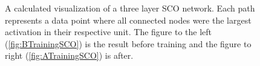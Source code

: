 \begin{figure}
    \caption[A calculated visualization of the activation of a three layer \acs{SCO} network, after training and displaying the
    signal and background separately.]{A calculated visualization of a three layer \acs{SCO} network. Each path 
    represents a data point where all connected nodes were the largest activation in their respective 
    unit. The figure to the left (\ref{fig:BTrainingSCO}) is the result before training and the figure to right (\ref{fig:ATrainingSCO})
    is after.} 
    \label{fig:NetDistSCO}
\end{figure}
\newpage

